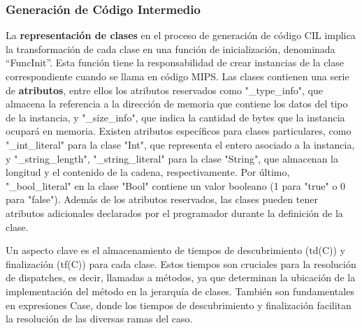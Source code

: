 \documentclass[10pt]{article} %
\begin{document}
%
%	
%	
%	
%	
	
	\subsubsection{Generaci\'on de C\'odigo Intermedio}
	
	La \textbf{representación de clases} en el proceso de generación de código CIL implica la transformación de cada clase en una función de inicialización, denominada ``FuncInit''. Esta función tiene la responsabilidad de crear instancias de la clase correspondiente cuando se llama en código MIPS. Las clases contienen una serie de \textbf{atributos}, entre ellos los atributos reservados como "\_type\_info", que almacena la referencia a la dirección de memoria que contiene los datos del tipo de la instancia, y "\_size\_info", que indica la cantidad de bytes que la instancia ocupará en memoria. Existen atributos específicos para clases particulares, como "\_int\_literal" para la clase "Int", que representa el entero asociado a la instancia, y "\_string\_length", "\_string\_literal" para la clase "String", que almacenan la longitud y el contenido de la cadena, respectivamente. Por último, "\_bool\_literal" en la clase "Bool" contiene un valor booleano (1 para "true" o 0 para "false"). Además de los atributos reservados, las clases pueden tener atributos adicionales declarados por el programador durante la definición de la clase.
	
	Un aspecto clave es el almacenamiento de tiempos de descubrimiento (td(C)) y finalización (tf(C)) para cada clase. Estos tiempos son cruciales para la resolución de dispatches, es decir, llamadas a métodos, ya que determinan la ubicación de la implementación del método en la jerarquía de clases. También son fundamentales en expresiones Case, donde los tiempos de descubrimiento y finalización facilitan la resolución de las diversas ramas del caso. 
	
\end{document}
